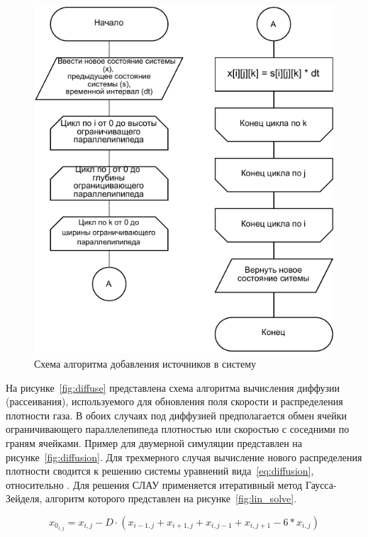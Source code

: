 \begin{figure}[H]
	\centering
	\includegraphics[width=1.0\textwidth, page=1]{assets/img/add_source.pdf}
	\caption{Схема алгоритма добавления источников в систему}
	\label{fig:add_src}
\end{figure}

На рисунке~\ref{fig:diffuse} представлена схема алгоритма вычисления диффузии (рассеивания), используемого для обновления поля скорости и распределения плотности газа. В обоих случаях под диффузией предполагается обмен ячейки ограничивающего параллелепипеда плотностью или скоростью с соседними по граням ячейками. Пример для двумерной симуляции представлен на рисунке~\ref{fig:diffusion}. Для трехмерного случая вычисление нового распределения плотности сводится к решению системы уравнений вида~\ref{eq:diffusion}, относительно . Для решения СЛАУ применяется итеративный метод Гаусса-Зейделя, алгоритм которого представлен на рисунке~\ref{fig:lin_solve}.

\begin{equation}
	\label{eq:diffusion}
	x_{0_{i,j}} = x_{i,j} - D \cdot (x_{i-1,j}+x_{i+1,j}+x_{i,j-1}+x_{i,j+1}-6*x_{i,j})
\end{equation}

